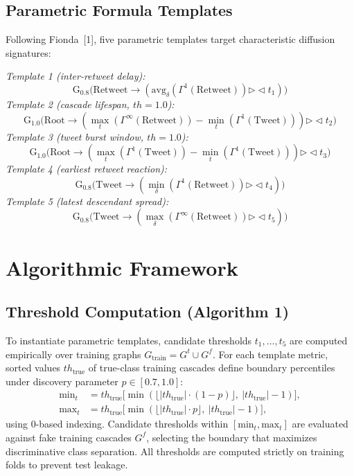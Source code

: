 \documentclass[10pt,twocolumn,a4paper]{article}
\renewcommand{\bowtie}{\mathrel{\triangleright\!\triangleleft}}
\begin{document}
\subsection{Parametric Formula Templates}
Following Fionda~[1], five parametric templates target characteristic diffusion signatures:
 
\textit{Template 1 (inter-retweet delay):}
\begin{equation*}
\mathrm{G}_{0.8}\big(\mathrm{Retweet}\to(\mathrm{avg}_{\delta}(\Gamma^1(\mathrm{Retweet}))\bowtie t_1)\big)
\end{equation*}
\textit{Template 2 (cascade lifespan, $th=1.0$):}
\begin{equation*}
\mathrm{G}_{1.0}\big(\mathrm{Root}\to(\max_{t}(\Gamma^{\infty}(\mathrm{Retweet}))-\min_{t}(\Gamma^{1}(\mathrm{Tweet})))\bowtie t_2\big)
\end{equation*}
\textit{Template 3 (tweet burst window, $th=1.0$):}
\begin{equation*}
\mathrm{G}_{1.0}\big(\mathrm{Root}\to(\max_{t}(\Gamma^{1}(\mathrm{Tweet}))-\min_{t}(\Gamma^{1}(\mathrm{Tweet})))\bowtie t_3\big)
\end{equation*}
\textit{Template 4 (earliest retweet reaction):}
\begin{equation*}
\mathrm{G}_{0.8}\big(\mathrm{Tweet}\to(\min_{\delta}(\Gamma^{1}(\mathrm{Retweet}))\bowtie t_4)\big)
\end{equation*}
\textit{Template 5 (latest descendant spread):}
\begin{equation*}
\mathrm{G}_{0.8}\big(\mathrm{Tweet}\to(\max_{\delta}(\Gamma^{\infty}(\mathrm{Retweet}))\bowtie t_5)\big)
\end{equation*}
 
\section{Algorithmic Framework}
\subsection{Threshold Computation (Algorithm 1)}
To instantiate parametric templates, candidate thresholds $t_1,\dots,t_5$ are computed empirically over training graphs $G_{\mathrm{train}}=G^{t}\cup G^{f}$. For each template metric, sorted values $th_{\mathrm{true}}$ of true-class training cascades define boundary percentiles under discovery parameter $p\in[0.7,1.0]$:
\begin{align}
\mathrm{min}_t &= th_{\mathrm{true}}\big[\min(\lfloor |th_{\mathrm{true}}|\cdot(1-p)\rfloor,\ |th_{\mathrm{true}}|-1)\big],\\
\mathrm{max}_t &= th_{\mathrm{true}}\big[\min(\lfloor |th_{\mathrm{true}}|\cdot p\rfloor,\ |th_{\mathrm{true}}|-1)\big],
\end{align}
using 0-based indexing. Candidate thresholds within $[\mathrm{min}_t, \mathrm{max}_t]$ are evaluated against fake training cascades $G^f$, selecting the boundary that maximizes discriminative class separation. All thresholds are computed strictly on training folds to prevent test leakage.
 
\end{document}
